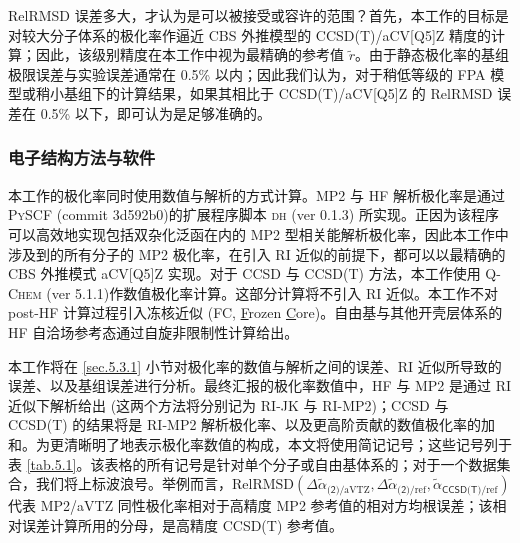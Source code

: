 RelRMSD 误差多大，才认为是可以被接受或容许的范围？首先，本工作的目标是对较大分子体系的极化率作逼近 CBS 外推模型的 CCSD(T)/aCV[Q5]Z 精度的计算；因此，该级别精度在本工作中视为最精确的参考值 $\tilde r$。由于静态极化率的基组极限误差与实验误差通常在 0.5\% 以内\cite{Brakestad-Frediani.JCTC.2020, Rumble-Rumble.CRC.2021}；因此我们认为，对于稍低等级的 FPA 模型或稍小基组下的计算结果，如果其相比于 CCSD(T)/aCV[Q5]Z 的 RelRMSD 误差在 0.5\% 以下，即可认为是足够准确的。


\subsubsection{电子结构方法与软件}

本工作的极化率同时使用数值与解析的方式计算。MP2 与 HF 解析极化率是通过 \textsc{PySCF} (commit 3d592b0)\cite{Sun-Chan.WCMS.2018, Sun-Chan.JCP.2020}的扩展程序脚本 \textsc{dh} (ver 0.1.3)\cite{dh-0.1.ajz34} 所实现。正因为该程序可以高效地实现包括双杂化泛函在内的 MP2 型相关能解析极化率，因此本工作中涉及到的所有分子的 MP2 极化率，在引入 RI 近似的前提下，都可以以最精确的 CBS 外推模式 aCV[Q5]Z 实现。对于 CCSD 与 CCSD(T) 方法，本工作使用 \textsc{Q-Chem} (ver 5.1.1)\cite{Shao-Head-Gordon.MP.2015, Kaliman-Krylov.JCC.2017}作数值极化率计算。这部分计算将不引入 RI 近似。本工作不对 post-HF 计算过程引入冻核近似 (FC, \underline{F}rozen \underline{C}ore)。自由基与其他开壳层体系的 HF 自洽场参考态通过自旋非限制性计算给出。

本工作将在 \ref{sec.5.3.1} 小节对极化率的数值与解析之间的误差、RI 近似所导致的误差、以及基组误差进行分析。最终汇报的极化率数值中，HF 与 MP2 是通过 RI 近似下解析给出 (这两个方法将分别记为 RI-JK 与 RI-MP2)；CCSD 与 CCSD(T) 的结果将是 RI-MP2 解析极化率、以及更高阶贡献的数值极化率的加和。为更清晰明了地表示极化率数值的构成，本文将使用简记记号；这些记号列于表 \ref{tab.5.1}。该表格的所有记号是针对单个分子或自由基体系的；对于一个数据集合，我们将上标波浪号。举例而言，$\text{RelRMSD} (\Delta \tilde \alpha_{\textsf{(2)}/\text{aVTZ}}, \Delta \tilde \alpha_{\textsf{(2)}/\text{ref}}, \tilde \alpha_{\textsf{CCSD(T)}/\text{ref}})$ 代表 MP2/aVTZ 同性极化率相对于高精度 MP2 参考值的相对方均根误差；该相对误差计算所用的分母，是高精度 CCSD(T) 参考值。

